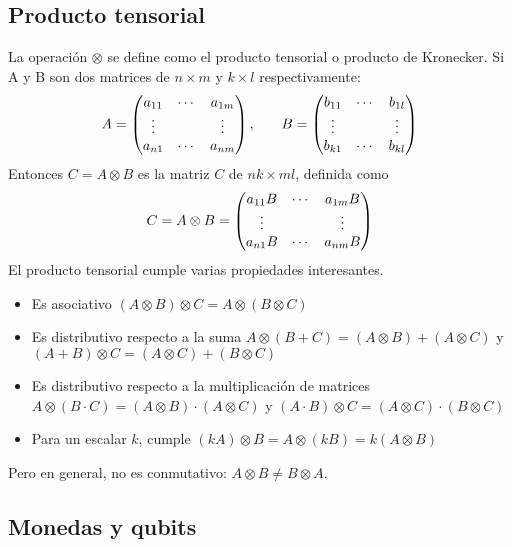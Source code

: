 \subsection{Producto tensorial}
\label{sss:producto-tensorial}

La operación $\otimes$ se define como el producto tensorial o producto de 
Kronecker. Si A y B son dos matrices de $n \times m$ y $k \times l$ 
respectivamente:
%
$$
\begin{array}{c c}
	A=\begin{pmatrix} 
		a_{11} & \cdots & a_{1m} \\
		\vdots &        & \vdots \\
		a_{n1} & \cdots & a_{nm}
	 \end{pmatrix}
	,\quad
	&
	B=\begin{pmatrix} 
		b_{11} & \cdots & b_{1l} \\
		\vdots &        & \vdots \\
		b_{k1} & \cdots & b_{kl}
	 \end{pmatrix}
\end{array}
$$
%
Entonces $C = A \otimes B$ es la matriz $C$ de $nk \times ml$, definida como
%
$$
C = A \otimes B=\begin{pmatrix} 
	a_{11} B & \cdots & a_{1m} B \\
	\vdots   &        & \vdots   \\
	a_{n1} B & \cdots & a_{nm} B
 \end{pmatrix}
$$
%
El producto tensorial cumple varias propiedades interesantes.
%
\begin{itemize}
\item Es asociativo $(A \otimes B) \otimes C = A \otimes (B \otimes C)$

\item Es distributivo respecto a la suma $A \otimes (B + C) = (A \otimes B) + (A
\otimes C) $ y $(A + B) \otimes C = (A \otimes C) + (B \otimes C)$

\item Es distributivo respecto a la multiplicación de matrices $A \otimes (B 
\cdot C) = (A \otimes B) \cdot (A \otimes C) $ y $(A \cdot B) \otimes C = (A 
\otimes C) \cdot (B \otimes C)$

\item Para un escalar $k$, cumple $(kA) \otimes B = A \otimes (kB) = k (A 
\otimes B)$
\end{itemize}
%
Pero en general, no es conmutativo: $A \otimes B \neq B \otimes A$.

\subsection{Monedas y qubits}

